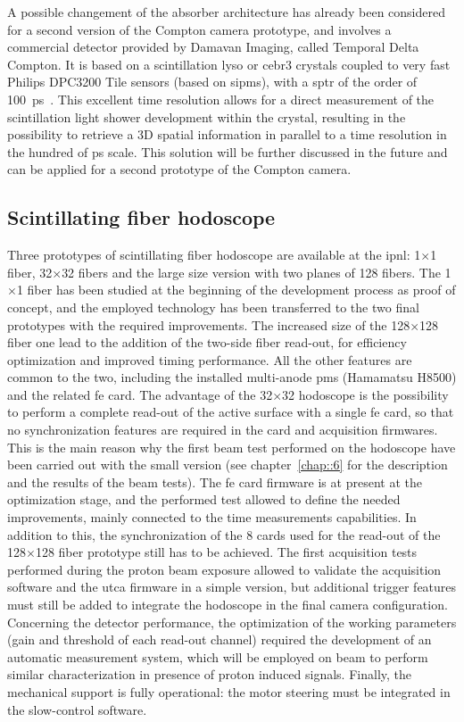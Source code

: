 A possible changement of the absorber architecture has already been considered for a second version of the Compton camera prototype, and involves a commercial detector provided by Damavan Imaging, called Temporal Delta Compton. It is based on a scintillation \gls{lyso} or \gls{cebr3} crystals coupled to very fast Philips DPC3200 Tile sensors (based on \glspl{sipm}), with a \gls{sptr} of the order of 100~ps~\parencite{Brunner2016}. This excellent time resolution allows for a direct measurement of the scintillation light shower development within the crystal, resulting in the possibility to retrieve a 3D spatial information in parallel to a time resolution in the hundred of ps scale. This solution will be further discussed in the future and can be applied for a second prototype of the Compton camera.  

\subsection{Scintillating fiber hodoscope}\label{chap3::subsec::hodoNext}

Three prototypes of scintillating fiber hodoscope are available at the \gls{ipnl}: 1$\times$1 fiber, 32$\times$32 fibers and the large size version with two planes of 128 fibers. The 1$\times$1 fiber has been studied at the beginning of the development process as proof of concept, and the employed technology has been transferred to the two final prototypes with the required improvements. The increased size of the 128$\times$128 fiber one lead to the addition of the two-side fiber read-out, for efficiency optimization and improved timing performance. All the other features are common to the two, including the installed multi-anode \glspl{pm} (Hamamatsu H8500) and the related \gls{fe} card. The advantage of the 32$\times$32 hodoscope is the possibility to perform a complete read-out of the active surface with a single \gls{fe} card, so that no synchronization features are required in the card and acquisition firmwares. This is the main reason why the first beam test performed on the hodoscope have been carried out with the small version (see chapter~\ref{chap::6} for the description and the results of the beam tests). The \gls{fe} card firmware is at present at the optimization stage, and the performed test allowed to define the needed improvements, mainly connected to the time measurements capabilities. In addition to this, the synchronization of the 8 cards used for the read-out of the 128$\times$128 fiber prototype still has to be achieved. The first acquisition tests performed during the proton beam exposure allowed to validate the acquisition software and the \gls{utca} firmware in a simple version, but additional trigger features must still be added to integrate the hodoscope in the final camera configuration. Concerning the detector performance, the optimization of the working parameters (gain and threshold of each read-out channel) required the development of an automatic measurement system, which will be employed on beam to perform similar characterization in presence of proton induced signals. Finally, the mechanical support is fully operational: the motor steering must be integrated in the slow-control software.

